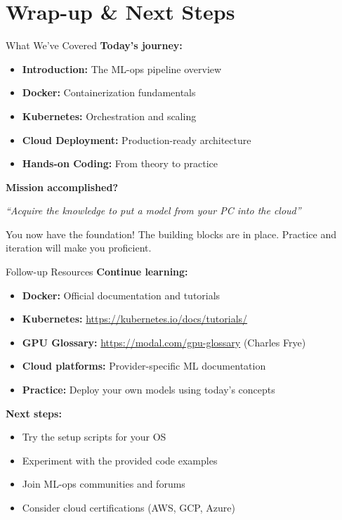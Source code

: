 \documentclass[../main.tex]{subfiles}
\begin{document}
\section{Wrap-up \& Next Steps}

\begin{frame}{What We've Covered}
    \textbf{Today's journey:}

    \begin{itemize}
        \item \textbf{Introduction:} The ML-ops pipeline overview
        \item \textbf{Docker:} Containerization fundamentals
        \item \textbf{Kubernetes:} Orchestration and scaling
        \item \textbf{Cloud Deployment:} Production-ready architecture
        \item \textbf{Hands-on Coding:} From theory to practice
    \end{itemize}

    \bigskip

    \textbf{Mission accomplished?}
    \begin{center}
        \textit{``Acquire the knowledge to put a model from your PC into the cloud''}
    \end{center}

    \bigskip

    \begin{alertblock}{You now have the foundation!}
        The building blocks are in place. Practice and iteration will make you proficient.
    \end{alertblock}
\end{frame}

\begin{frame}{Follow-up Resources}
    \textbf{Continue learning:}

    \begin{itemize}
        \item \textbf{Docker:} Official documentation and tutorials
        \item \textbf{Kubernetes:} \url{https://kubernetes.io/docs/tutorials/}
        \item \textbf{GPU Glossary:} \url{https://modal.com/gpu-glossary} (Charles Frye)
        \item \textbf{Cloud platforms:} Provider-specific ML documentation
        \item \textbf{Practice:} Deploy your own models using today's concepts
    \end{itemize}

    \bigskip

    \textbf{Next steps:}
    \begin{itemize}
        \item Try the setup scripts for your OS
        \item Experiment with the provided code examples
        \item Join ML-ops communities and forums
        \item Consider cloud certifications (AWS, GCP, Azure)
    \end{itemize}
\end{frame}
\end{document}
